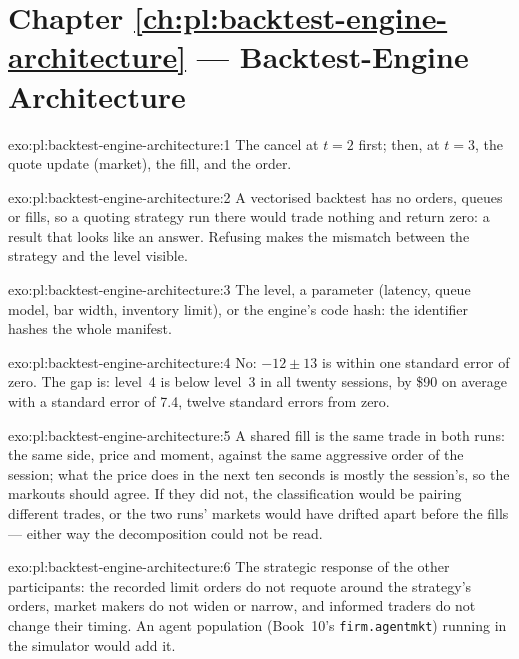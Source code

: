 \section*{Chapter \ref{ch:pl:backtest-engine-architecture} --- Backtest-Engine Architecture}

\begin{solution}{exo:pl:backtest-engine-architecture:1}
The cancel at $t = 2$ first; then, at $t = 3$, the quote update (market), the fill, and the order.
\end{solution}

\begin{solution}{exo:pl:backtest-engine-architecture:2}
A vectorised backtest has no orders, queues or fills, so a quoting strategy run there would trade nothing and return zero: a result that
looks like an answer. Refusing makes the mismatch between the strategy and the level visible.
\end{solution}

\begin{solution}{exo:pl:backtest-engine-architecture:3}
The level, a parameter (latency, queue model, bar width, inventory limit), or the engine's code hash: the identifier hashes the whole
manifest.
\end{solution}

\begin{solution}{exo:pl:backtest-engine-architecture:4}
No: $-12 \pm 13$ is within one standard error of zero. The gap is: level~4 is below level~3 in all twenty sessions, by \$90 on average
with a standard error of 7.4, twelve standard errors from zero.
\end{solution}

\begin{solution}{exo:pl:backtest-engine-architecture:5}
A shared fill is the same trade in both runs: the same side, price and moment, against the same aggressive order of the session; what the
price does in the next ten seconds is mostly the session's, so the markouts should agree. If they did not, the classification would be
pairing different trades, or the two runs' markets would have drifted apart before the fills --- either way the decomposition could not be
read.
\end{solution}

\begin{solution}{exo:pl:backtest-engine-architecture:6}
The strategic response of the other participants: the recorded limit orders do not requote around the strategy's orders, market makers do
not widen or narrow, and informed traders do not change their timing. An agent population (Book~10's \texttt{firm.agentmkt}) running in the
simulator would add it.
\end{solution}

